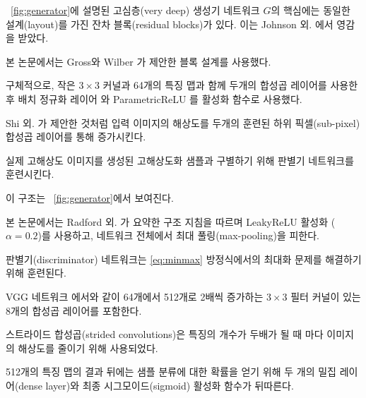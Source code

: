 \documentclass[10pt,twocolumn,letterpaper]{article}
\newcommand{\kor}[1]{#1}
\newcommand{\eng}[1]{}
\begin{document}
\eng{
At the core of our very deep generator network $G$, which is illustrated in \figurename~\ref{fig:generator} are $B$ residual blocks with identical layout. Inspired by Johnson et al.
}\kor{
\figurename~\ref{fig:generator}에 설명된 고심층(very deep) 생성기 네트워크 $G$의 핵심에는 동일한 설계(layout)를 가진 잔차 블록(residual blocks)가 있다. 이는 Johnson 외. \cite{Johnson16PercepLoss}에서 영감을 받았다.
} \eng{
we employ the block layout proposed by Gross and Wilber \cite{gross2016}.
}\kor{
본 논문에서는 Gross와 Wilber \cite{gross2016}가 제안한 블록 설계를 사용했다.
} \eng{
Specifically, we use two convolutional layers with small $3\times3$ kernels and 64 feature maps followed by batch-normalization layers \cite{Ioffe2015} and ParametricReLU \cite{He2015relu} as the activation function.
}\kor{
구체적으로, 작은 $3\times3$ 커널과 64개의 특징 맵과 함께 두개의 합성곱 레이어를 사용한 후 배치 정규화 레이어 \cite{Ioffe2015}와 ParametricReLU \cite{He2015relu}를 활성화 함수로 사용했다.
}
\eng{
We increase the resolution of the input image with two trained sub-pixel convolution layers as proposed by Shi et al. \cite{Shi2016ESPCN}.
}\kor{
Shi 외. \cite{Shi2016ESPCN}가 제안한 것처럼 입력 이미지의 해상도를 두개의 훈련된 하위 픽셀(sub-pixel) 합성곱 레이어를 통해 증가시킨다.
}

\eng{
To discriminate real \ac{HR} images from generated \ac{SR} samples we train a discriminator network.
}\kor{
실제 \ac{고해상도} 이미지를 생성된 고해상도화 샘플과 구별하기 위해 판별기 네트워크를 훈련시킨다.
} \eng{
The architecture is shown in \figurename~\ref{fig:generator}.
}\kor{
이 구조는 \figurename~\ref{fig:generator}에서 보여진다.
}
\eng{
We follow the architectural guidelines summarized by Radford et al. \cite{Radford2015} and use LeakyReLU activation ($\alpha=0.2$) and avoid max-pooling throughout the network.
}\kor{
본 논문에서는 Radford 외. \cite{Radford2015}가 요약한 구조 지침을 따르며 LeakyReLU 활성화 ($\alpha=0.2$)를 사용하고, 네트워크 전체에서 최대 풀링(max-pooling)을 피한다.
} \eng{
The discriminator network is trained to solve the maximization problem in Equation \ref{eq:minmax}.
}\kor{
판별기(discriminator) 네트워크는 \ref{eq:minmax} 방정식에서의 최대화 문제를 해결하기 위해 훈련된다.
} \eng{
It contains eight convolutional layers with an increasing number of $3\times3$ filter kernels, increasing by a factor of 2 from 64 to 512 kernels as in the VGG network \cite{simonyan2014very}.
}\kor{
VGG 네트워크 \cite{simonyan2014very}에서와 같이 64개에서 512개로 2배씩 증가하는 $3\times3$ 필터 커널이 있는 8개의 합성곱 레이어를 포함한다.
} \eng{
Strided convolutions are used to reduce the image resolution each time the number of features is doubled.
}\kor{
스트라이드 합성곱(strided convolutions)은 특징의 개수가 두배가 될 때 마다 이미지의 해상도를 줄이기 위해 사용되었다.
} \eng{
The resulting 512 feature maps are followed by two dense layers and a final sigmoid activation function to obtain a probability for sample classification.
}\kor{
512개의 특징 맵의 결과 뒤에는 샘플 분류에 대한 확률을 얻기 위해 두 개의 밀집 레이어(dense layer)와 최종 시그모이드(sigmoid) 활성화 함수가 뒤따른다.
}
\end{document}
